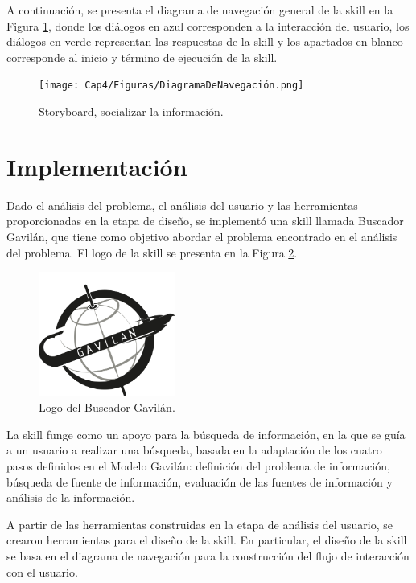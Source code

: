 A continuación, se presenta el diagrama de navegación general de la skill en la Figura \ref{fig:422}, donde los diálogos en azul corresponden a la interacción del usuario, los diálogos en verde representan las respuestas de la skill y los apartados en blanco corresponde al inicio y término de ejecución de la skill.

\begin{figure}[H]
  \centering
  \texttt{[image: Cap4/Figuras/DiagramaDeNavegación.png]}
  \caption{Storyboard, socializar la información.}
  \label{fig:422}
\end{figure}


\section{Implementación}
\label{ImplementacioncapIV}

Dado el análisis del problema, el análisis del usuario y las herramientas proporcionadas en la etapa de diseño, se implementó una skill llamada Buscador Gavilán, que tiene como objetivo abordar el problema encontrado en el análisis del problema. El logo de la skill se presenta en la Figura \ref{fig:423}.

\begin{figure}[H]
  \centering
  \includegraphics[width=0.40\textwidth]{Cap4/Figuras/LogoSkill.png}
  \caption{Logo del Buscador Gavilán.}
  \label{fig:423}
\end{figure}

La skill funge como un apoyo para la búsqueda de información, en la que se guía a un usuario a realizar una búsqueda, basada en la adaptación de los cuatro pasos definidos en el Modelo Gavilán: definición del problema de información, búsqueda de fuente de información, evaluación de las fuentes de información y análisis de la información.

A partir de las herramientas construidas en la etapa de análisis del usuario, se crearon herramientas para el diseño de la skill. En particular, el diseño de la skill se basa en el diagrama de navegación para la construcción del flujo de interacción con el usuario.


